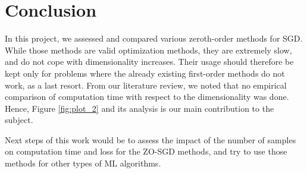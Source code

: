\section{Conclusion}\label{sec:conclusion}
In this project, we assessed and compared various zeroth-order methods for SGD. While those methods are valid optimization methods, they are extremely slow, and do not cope with dimensionality increases. Their usage should therefore be kept only for problems where the already existing first-order methods do not work, as a last resort. From our literature review, we noted that no empirical comparison of computation time with respect to the dimensionality was done. Hence, Figure \ref{fig:plot_2} and its analysis is our main contribution to the subject.

Next steps of this work would be to assess the impact of the number of samples on computation time and loss for the ZO-SGD methods, and try to use those methods for other types of ML algorithms.